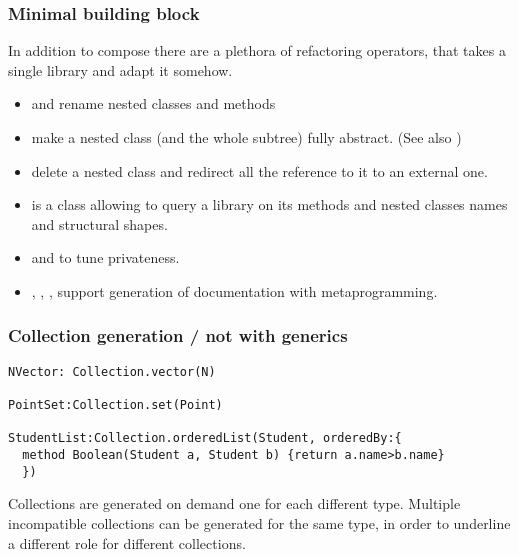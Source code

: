 \begin{frame}[fragile]
\frametitle{Minimal building block}

In addition to compose there are a plethora of \alert{refactoring} operators, that takes a single library and adapt it somehow.
\begin{itemize}
\PresentationOnly\pause\item \Q@RenamePath@ and \Q@RenameSelector@ rename nested classes and methods
\PresentationOnly\pause\item \Q@RemoveImplementationPath@  make a nested class (and the whole subtree) fully abstract. (See also \Q@RemoveImplementationSelector@)
\PresentationOnly\pause\item \Q@Redirect@ delete a  nested class and redirect all the reference to it to an external one.
\PresentationOnly\pause\item \Q@Introspect@ is a class allowing to query a library on its methods and nested classes names and structural shapes.
\PresentationOnly\pause\item \Q@MakePrivatePath@ and \Q@MakePrivateSelector@ to tune privateness.
\PresentationOnly\pause\item \Q@AddDocumentationPath@, \Q@AddDocumentationSelector@, \Q@RemoveDocumentationPath@, \Q@RemoveDocumentationSelector@
support generation of documentation with metaprogramming.
\end{itemize}
\end{frame}


\begin{frame}[fragile]
\frametitle{Collection generation / not with generics}
\begin{NiceCode}{59ex}{0.8}
\begin{lstlisting}
NVector: Collection.vector(N)

PointSet:Collection.set(Point)

StudentList:Collection.orderedList(Student, orderedBy:{
  method Boolean(Student a, Student b) {return a.name>b.name}
  })
\end{lstlisting}
\end{NiceCode}
Collections are generated on demand one for each different type.
Multiple incompatible collections can be generated for the same type, in order to underline a different role for different collections.
\end{frame}

